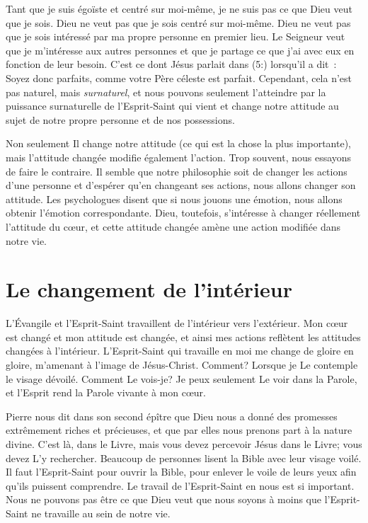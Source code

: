 Tant que je suis égoïste et centré sur moi-même,
 je ne suis pas ce que Dieu veut que je sois.
 Dieu ne veut pas que je sois centré sur moi-même.
 Dieu ne veut pas que je sois intéressé par ma propre personne
 en premier lieu.
 Le Seigneur veut que je m'intéresse aux autres personnes et que
 je partage ce que j'ai avec eux en fonction de leur besoin.
 C'est ce dont Jésus parlait dans (5:) lorsqu'il a dit~:
 \og Soyez donc parfaits, comme votre Père céleste est parfait. \fg{}
 Cependant, cela n'est pas naturel, mais \emph{surnaturel}, et nous pouvons seulement
 l'atteindre par la puissance surnaturelle de l'Esprit-Saint
 qui vient et change notre attitude au sujet de notre propre personne
 et de nos possessions.

Non seulement Il change notre attitude (ce qui est la chose la plus importante),
 mais l'attitude changée modifie également l'action.
 Trop souvent, nous essayons de faire le contraire.
 Il semble que notre philosophie soit de changer les actions d'une personne
 et d'espérer qu'en changeant ses actions, nous allons changer son attitude.
 Les psychologues disent que si nous jouons une émotion, nous allons obtenir
 l'émotion correspondante.
 Dieu, toutefois, s'intéresse à changer réellement l'attitude du cœur,
 et cette attitude changée amène une action modifiée dans notre vie.


\section*{Le changement de l'intérieur}

L'Évangile et l'Esprit-Saint travaillent de l'intérieur vers l'extérieur.
 Mon cœur est changé et mon attitude est changée,
 et ainsi mes actions reflètent les attitudes changées à l'intérieur.
 L'Esprit-Saint qui travaille en moi me change de gloire en gloire,
 m'amenant à l'image de Jésus-Christ. Comment?
 Lorsque je Le contemple le visage dévoilé.
 Comment Le vois-je? Je peux seulement Le voir dans la Parole,
 et l'Esprit rend la Parole vivante à mon cœur.

Pierre nous dit dans son second épître que Dieu nous a donné
 des promesses extrêmement riches et précieuses,
 et que par elles nous prenons part à la nature divine.
 C'est là, dans le Livre, mais vous devez percevoir Jésus dans le Livre;
 vous devez L'y rechercher.
 Beaucoup de personnes lisent la Bible avec leur visage voilé.
 Il faut l'Esprit-Saint pour ouvrir la Bible, pour enlever le voile
 de leurs yeux afin qu'ils puissent comprendre.
 Le travail de l'Esprit-Saint en nous est si important.
 Nous ne pouvons pas être ce que Dieu veut que nous soyons
 à moins que l'Esprit-Saint ne travaille au sein de notre vie.

